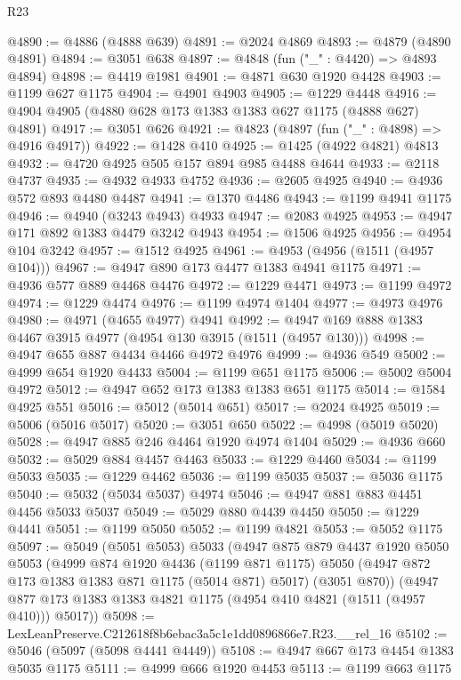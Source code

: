 \begin{lexlean}{R23}
\begin{coremodule}
@4890 := @4886 (@4888 @639)
@4891 := @2024 @4869
@4893 := @4879 (@4890 @4891)
@4894 := @3051 @638
@4897 := @4848 (fun ("_" : @4420) => @4893 @4894)
@4898 := @4419 @1981
@4901 := @4871 @630 @1920 @4428
@4903 := @1199 @627 @1175
@4904 := @4901 @4903
@4905 := @1229 @4448
@4916 := @4904 @4905 (@4880 @628 @173 @1383 @1383 @627 @1175 (@4888 @627) @4891)
@4917 := @3051 @626
@4921 := @4823 (@4897 (fun ("_" : @4898) => @4916 @4917))
@4922 := @1428 @410
@4925 := @1425 (@4922 @4821) @4813
@4932 := @4720 @4925 @505 @157 @894 @985 @4488 @4644
@4933 := @2118 @4737
@4935 := @4932 @4933 @4752
@4936 := @2605 @4925
@4940 := @4936 @572 @893 @4480 @4487
@4941 := @1370 @4486
@4943 := @1199 @4941 @1175
@4946 := @4940 (@3243 @4943) @4933
@4947 := @2083 @4925
@4953 := @4947 @171 @892 @1383 @4479 @3242 @4943
@4954 := @1506 @4925
@4956 := @4954 @104 @3242
@4957 := @1512 @4925
@4961 := @4953 (@4956 (@1511 (@4957 @104)))
@4967 := @4947 @890 @173 @4477 @1383 @4941 @1175
@4971 := @4936 @577 @889 @4468 @4476
@4972 := @1229 @4471
@4973 := @1199 @4972
@4974 := @1229 @4474
@4976 := @1199 @4974 @1404
@4977 := @4973 @4976
@4980 := @4971 (@4655 @4977) @4941
@4992 := @4947 @169 @888 @1383 @4467 @3915 @4977 (@4954 @130 @3915 (@1511 (@4957 @130)))
@4998 := @4947 @655 @887 @4434 @4466 @4972 @4976
@4999 := @4936 @549
@5002 := @4999 @654 @1920 @4433
@5004 := @1199 @651 @1175
@5006 := @5002 @5004 @4972
@5012 := @4947 @652 @173 @1383 @1383 @651 @1175
@5014 := @1584 @4925 @551
@5016 := @5012 (@5014 @651)
@5017 := @2024 @4925
@5019 := @5006 (@5016 @5017)
@5020 := @3051 @650
@5022 := @4998 (@5019 @5020)
@5028 := @4947 @885 @246 @4464 @1920 @4974 @1404
@5029 := @4936 @660
@5032 := @5029 @884 @4457 @4463
@5033 := @1229 @4460
@5034 := @1199 @5033
@5035 := @1229 @4462
@5036 := @1199 @5035
@5037 := @5036 @1175
@5040 := @5032 (@5034 @5037) @4974
@5046 := @4947 @881 @883 @4451 @4456 @5033 @5037
@5049 := @5029 @880 @4439 @4450
@5050 := @1229 @4441
@5051 := @1199 @5050
@5052 := @1199 @4821
@5053 := @5052 @1175
@5097 := @5049
    (@5051 @5053)
    @5033
    (@4947
      @875
      @879
      @4437
      @1920
      @5050
      @5053
      (@4999
        @874
        @1920
        @4436
        (@1199 @871 @1175)
        @5050
        (@4947 @872 @173 @1383 @1383 @871 @1175 (@5014 @871) @5017)
        (@3051 @870))
      (@4947 @877 @173 @1383 @1383 @4821 @1175 (@4954 @410 @4821 (@1511 (@4957 @410))) @5017))
@5098 := LexLeanPreserve.C212618f8b6ebac3a5c1e1dd0896866e7.R23.__rel_16
@5102 := @5046 (@5097 (@5098 @4441 @4449))
@5108 := @4947 @667 @173 @4454 @1383 @5035 @1175
@5111 := @4999 @666 @1920 @4453
@5113 := @1199 @663 @1175

\end{coremodule}
\end{lexlean}
